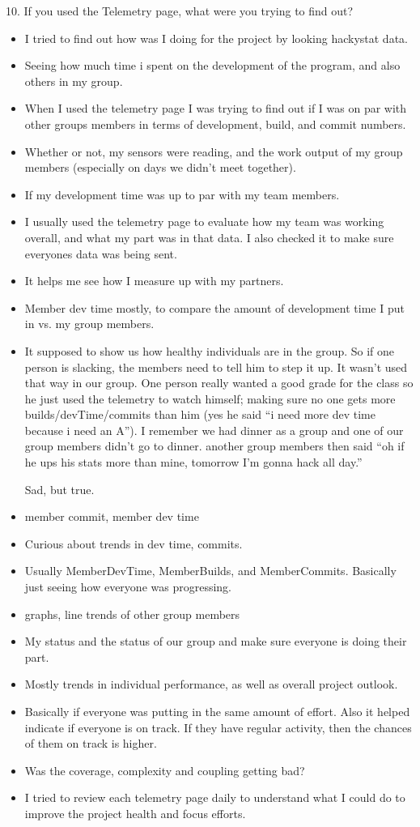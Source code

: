 \documentclass[11pt]{article}
\begin{document}
10. If you used the Telemetry page, what were you trying to find out? 
\begin{itemize}
\item I tried to find out how was I doing for the project by looking hackystat data. 
\item Seeing how much time i spent on the development of the program, and also others in my group.  
\item When I used the telemetry page I was trying to find out if I was on par with other groups members in terms of development, build, and commit numbers.
\item Whether or not, my sensors were reading, and the work output of my group members (especially on days we didn't meet together).
\item If my development time was up to par with my team members.
\item I usually used the telemetry page to evaluate how my team was working overall, and what my part was in that data. I also checked it to make sure everyones data was being sent.
\item It helps me see how I measure up with my partners.
\item Member dev time mostly, to compare the amount of development time I put in vs. my group members.
\item It supposed to show us how healthy individuals are in the group. So if one person is slacking, the members need to tell him to step it up.  It wasn't used that way in our group.  One person really wanted a good grade for the class so he just used the telemetry to watch himself; making sure no one gets more builds/devTime/commits than him (yes he said ``i need more dev time because i need an A'').  I remember we had dinner as a group and one of our group members didn't go to dinner.  another group members then said ``oh if he ups his stats more than mine, tomorrow I'm gonna hack all day.''

Sad, but true.
\item member commit, member dev time
\item Curious about trends in dev time, commits.
\item Usually MemberDevTime, MemberBuilds, and MemberCommits.  Basically just seeing how everyone was progressing.
\item graphs, line trends of other group members
\item My status and the status of our group and make sure everyone is doing their part.
\item Mostly trends in individual performance, as well as overall project outlook.
\item Basically if everyone was putting in the same amount of effort.  Also it helped indicate if everyone is on track.  If they have regular activity, then the chances of them on track is higher.  
\item Was the coverage, complexity and coupling getting bad?
\item I tried to review each telemetry page daily to understand what I could do to improve the project health and focus efforts.
\end{itemize}
\end{document}
